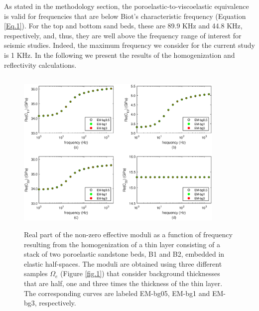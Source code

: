 \documentclass[draft]{agujournal2019}
\begin{document}
As stated in the methodology section, the poroelastic-to-viscoelastic equivalence is valid for frequencies that are below Biot's characteristic frequency (Equation \eqref{Eq.1}). For the top and bottom sand beds, these are 89.9 KHz and 44.8 KHz, respectively, and, thus, they are well above the frequency range of interest for seismic studies. Indeed, the maximum frequency we consider for the current study is 1 KHz. 
In the following we present the results of the homogenization and reflectivity calculations.
\begin{figure}[!ht]
\centering
        \includegraphics[width=100mm, height=80mm]{cijbg_2sandshale.eps}
\caption{Real part of the non-zero effective moduli as a function of frequency resulting from the homogenization of a thin layer consisting of a stack of two poroelastic sandstone beds, B1 and B2, embedded in elastic half-spaces. The moduli are obtained using three different samples $\Omega_e$ (Figure \ref{fig.1}) that consider background thicknesses that are half, one and three times the thickness of the thin layer. The corresponding curves are labeled EM-bg05, EM-bg1 and EM-bg3, respectively.}
\label{fig.2}
\end{figure}
\end{document}
